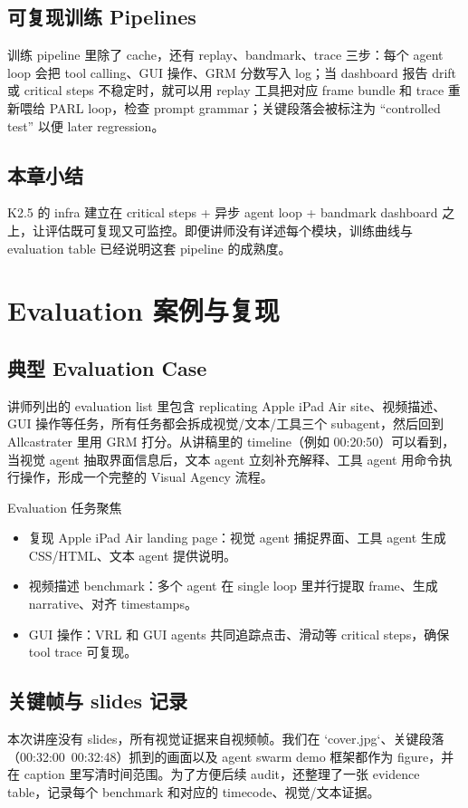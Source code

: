 \documentclass[a4paper]{article}
\begin{document}
\subsection{可复现训练 Pipelines}
训练 pipeline 里除了 cache，还有 replay、bandmark、trace 三步：每个 agent loop 会把 tool calling、GUI 操作、GRM 分数写入 log；当 dashboard 报告 drift 或 critical steps 不稳定时，就可以用 replay 工具把对应 frame bundle 和 trace 重新喂给 PARL loop，检查 prompt grammar；关键段落会被标注为 ``controlled test'' 以便 later regression。

\subsection{本章小结}
K2.5 的 infra 建立在 critical steps + 异步 agent loop + bandmark dashboard 之上，让评估既可复现又可监控。即便讲师没有详述每个模块，训练曲线与 evaluation table 已经说明这套 pipeline 的成熟度。
\section{Evaluation 案例与复现}

\subsection{典型 Evaluation Case}
讲师列出的 evaluation list 里包含 replicating Apple iPad Air site、视频描述、GUI 操作等任务，所有任务都会拆成视觉/文本/工具三个 subagent，然后回到 Allcastrater 里用 GRM 打分。从讲稿里的 timeline（例如 00:20:50）可以看到，当视觉 agent 抽取界面信息后，文本 agent 立刻补充解释、工具 agent 用命令执行操作，形成一个完整的 Visual Agency 流程。

\begin{knowledgebox}{Evaluation 任务聚焦}
\begin{itemize}
    \item 复现 Apple iPad Air landing page：视觉 agent 捕捉界面、工具 agent 生成 CSS/HTML、文本 agent 提供说明。
    \item 视频描述 benchmark：多个 agent 在 single loop 里并行提取 frame、生成 narrative、对齐 timestamps。
    \item GUI 操作：VRL 和 GUI agents 共同追踪点击、滑动等 critical steps，确保 tool trace 可复现。
\end{itemize}
\end{knowledgebox}

\subsection{关键帧与 slides 记录}
本次讲座没有 slides，所有视觉证据来自视频帧。我们在 `cover.jpg`、关键段落（00:32:00~00:32:48）抓到的画面以及 agent swarm demo 框架都作为 figure，并在 caption 里写清时间范围。为了方便后续 audit，还整理了一张 evidence table，记录每个 benchmark 和对应的 timecode、视觉/文本证据。
\end{document}
